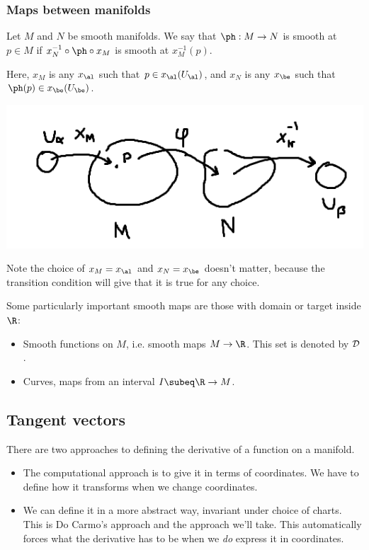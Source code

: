 \subsubsection{Maps between manifolds}
\begin{df}
Let $M$ and $N$ be smooth manifolds.
We say that $\ph:M\to N$ is smooth at $p\in M$ if $x_N^{-1}\circ \ph\circ x_M$ is smooth at $x_M^{-1}(p)$.

Here, $x_M$ is any $x_{\al}$ such that $p\in x_{\al}(U_{\al})$, and $x_N$ is any $x_{\be}$ such that $\ph(p)\in x_{\be}(U_{\be})$.
\end{df}

\begin{center}
\includegraphics{1-2}
\end{center}

Note the choice of $x_M=x_{\al}$ and $x_N=x_{\be}$ doesn't matter, because the transition condition will give that it is true for any choice.

Some particularly important smooth maps are those with domain or target inside $\R$:
\begin{itemize}
\item
Smooth functions on $M$, i.e. smooth maps $M\to \R$. This set is denoted by $\cal D$.
\item
Curves, maps from an interval $I\subeq \R\to M$.
\end{itemize}

\subsection{Tangent vectors}


There are two approaches to defining the derivative of a function on a manifold. 
\begin{itemize}
\item
The computational approach is to give it in terms of coordinates. We have to define how it transforms when we change coordinates.
\item
We can define it in a more abstract way, invariant under choice of charts. This is Do Carmo's approach and the approach we'll take. This automatically forces what the derivative has to be when we \emph{do} express it in coordinates.
\end{itemize}

